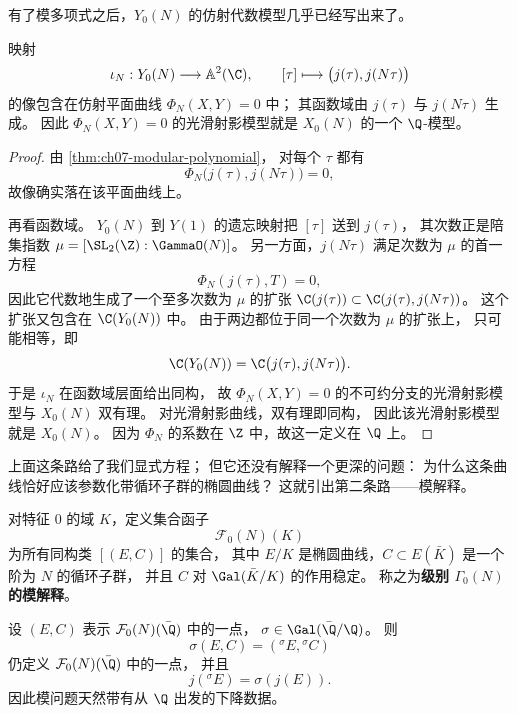 有了模多项式之后，$Y_0(N)$ 的仿射代数模型几乎已经写出来了。

\begin{proposition}
\label{prop:ch07-affine-model-y0n}
映射
\[
  \iota_N:Y_0(N)\longrightarrow \mathbb A^2(\C),
  \qquad
  [\tau]\longmapsto \bigl(j(\tau),j(N\tau)\bigr)
\]
的像包含在仿射平面曲线 $\Phi_N(X,Y)=0$ 中；
其函数域由 $j(\tau)$ 与 $j(N\tau)$ 生成。
因此 $\Phi_N(X,Y)=0$ 的光滑射影模型就是 $X_0(N)$ 的一个 $\Q$-模型。
\end{proposition}

\begin{proof}
由 \cref{thm:ch07-modular-polynomial}，
对每个 $\tau$ 都有
\[
  \Phi_N\bigl(j(\tau),j(N\tau)\bigr)=0,
\]
故像确实落在该平面曲线上。

再看函数域。
$Y_0(N)$ 到 $Y(1)$ 的遗忘映射把 $[\tau]$ 送到 $j(\tau)$，
其次数正是陪集指数 $\mu=[\SL_2(\Z):\GammaO(N)]$。
另一方面，$j(N\tau)$ 满足次数为 $\mu$ 的首一方程
\[
  \Phi_N(j(\tau),T)=0,
\]
因此它代数地生成了一个至多次数为 $\mu$ 的扩张
$\C(j(\tau))\subset \C(j(\tau),j(N\tau))$。
这个扩张又包含在 $\C(Y_0(N))$ 中。
由于两边都位于同一个次数为 $\mu$ 的扩张上，
只可能相等，即
\[
  \C(Y_0(N))=\C\bigl(j(\tau),j(N\tau)\bigr).
\]
于是 $\iota_N$ 在函数域层面给出同构，
故 $\Phi_N(X,Y)=0$ 的不可约分支的光滑射影模型与 $X_0(N)$ 双有理。
对光滑射影曲线，双有理即同构，
因此该光滑射影模型就是 $X_0(N)$。
因为 $\Phi_N$ 的系数在 $\Z$ 中，故这一定义在 $\Q$ 上。
\end{proof}

上面这条路给了我们显式方程；
但它还没有解释一个更深的问题：
为什么这条曲线恰好应该参数化带循环子群的椭圆曲线？
这就引出第二条路——模解释。

\begin{definition}
\label{def:ch07-modular-problem}
对特征 $0$ 的域 $K$，定义集合函子
\[
  \mathcal F_0(N)(K)
\]
为所有同构类 $[(E,C)]$ 的集合，
其中 $E/K$ 是椭圆曲线，$C\subset E(\bar K)$ 是一个阶为 $N$ 的循环子群，
并且 $C$ 对 $\Gal(\bar K/K)$ 的作用稳定。
称之为\textbf{级别 $\Gamma_0(N)$ 的模解释}。
\end{definition}

\begin{proposition}
\label{prop:ch07-moduli-galois}
设 $(E,C)$ 表示 $\mathcal F_0(N)(\bar\Q)$ 中的一点，
$\sigma\in\Gal(\bar\Q/\Q)$。
则
\[
  \sigma(E,C)=({}^{\sigma}E,{}^{\sigma}C)
\]
仍定义 $\mathcal F_0(N)(\bar\Q)$ 中的一点，
并且
\[
  j({}^{\sigma}E)=\sigma(j(E)).
\]
因此模问题天然带有从 $\Q$ 出发的下降数据。
\end{proposition}

